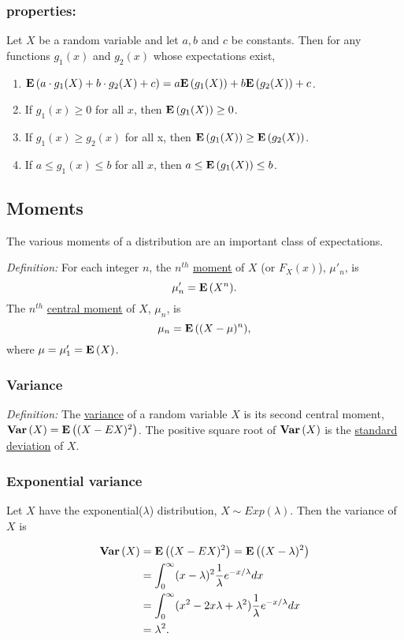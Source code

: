 \subsubsection*{properties:}
Let $X$ be a random variable and let $a, b$ and $c$ be constants. Then for any functions $g_1(x)$ and $g_2(x)$ whose expectations exist,
\begin{enumerate}
  \item ${\mathbf{E}\left(a \cdot g_1(X)  + b \cdot g_2(X) + c\right)} = a {\mathbf{E}\left(g_1(X)\right)} + b{\mathbf{E}\left(g_2(X)\right)} + c$.
  \item If $g_1(x) \ge 0$ for all $x$, then ${\mathbf{E}\left(g_1(X)\right)} \ge 0$.
  \item If $g_1(x) \ge g_2(x)$ for all x, then ${\mathbf{E}\left(g_1(X)\right)} \ge {\mathbf{E}\left(g_2(X)\right)}$.
  \item If $a \le g_1(x) \le b$ for all $x$, then $a \le {\mathbf{E}\left(g_1(X)\right)} \le b$.
\end{enumerate}

\subsection*{Moments}
The various moments of a distribution are an important class of expectations.

{\it Definition: } For each integer $n$, the $n^{th}$ \underline{moment} of $X$ (or $F_X(x)$), $\mu'_n$, is
$$
\mu'_n = {\mathbf{E}\left(X^n\right)}.
$$
The $n^{th}$ \underline{central moment} of $X$, $\mu_n$, is
$$
\mu_n = {\mathbf{E}\left((X-\mu)^n\right)},
$$
where $\mu = \mu'_1 = {\mathbf{E}\left(X\right)}$.

\subsubsection*{Variance}
{\it Definition: } The \underline{variance} of a random variable $X$ is its second central moment, $\mathbf{Var}\left(X\right) = {\mathbf{E}\left((X - EX)^2\right)}$.
The positive square root of $\mathbf{Var}\left(X\right)$ is the \underline{standard deviation} of $X$.

\subsubsection*{Exponential variance}
Let $X$ have the exponential($\lambda$) distribution, $X \sim Exp(\lambda)$.  Then the variance of $X$ is\\
%
\begin{pf}
$$
\begin{aligned}
\mathbf{Var}\left(X\right) &= {\mathbf{E}\left((X - EX)^2\right)} = {\mathbf{E}\left((X - \lambda)^2\right)}\\
&= \int_0^{\infty} (x - \lambda)^2 \frac{1}{\lambda} e^{-x/ \lambda}dx\\
&= \int_0^\infty (x^2 - 2x\lambda + \lambda^2) \frac{1}{\lambda}e^{-x / \lambda}dx\\
&= \lambda^2.
\end{aligned}
$$
\end{pf}

